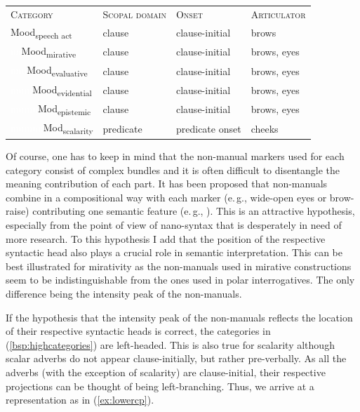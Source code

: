 \begin{exe}
\ex\label{bsp:highcategories} 
\begin{adjustbox}{max width=0.9\textwidth}
\begin{tabular}[t]{p{3.2cm}p{2.8cm}p{2.6cm}p{2.5cm}} %
\textsc{Category} & \textsc{Scopal domain} & \textsc{Onset} & \textsc{Articulator}  \\
Mood\textsubscript{speech act} & clause & clause-initial & brows \\
\textcolor{white}{nn}Mood\textsubscript{mirative} & clause & clause-initial & brows, eyes\\
\textcolor{white}{nnn}Mood\textsubscript{evaluative} & clause & clause-initial & brows, eyes \\
\textcolor{white}{nnnn}Mood\textsubscript{evidential} & clause & clause-initial & brows, eyes \\
\textcolor{white}{nnnnn}Mod\textsubscript{epistemic} & clause & clause-initial & brows, eyes \\
\textcolor{white}{nnnnnn}Mod\textsubscript{scalarity} & predicate & predicate onset & cheeks \\
\end{tabular}
\end{adjustbox}
\end{exe}

\noindent Of course, one has to keep in mind that the non-manual markers used for each category consist of complex bundles and it is often difficult to disentangle the meaning contribution of each part. It has been proposed that non-manuals combine in a compositional way with each marker (e.\,g., wide-open eyes or brow-raise) contributing one semantic feature (e.\,g., \citealt{herrmann2013modal}). This is an attractive hypothesis, especially from the point of view of nano-syntax that is desperately in need of more research. To this hypothesis I add that the position of the respective syntactic head also plays a crucial role in semantic interpretation. This can be best illustrated for mirativity as the non-manuals used in mirative constructions seem to be indistinguishable from the ones used in polar interrogatives. The only difference being the intensity peak of the non-manuals. 

If the hypothesis that the intensity peak of the non-manuals reflects the location of their respective syntactic heads is correct, the categories in (\ref{bsp:highcategories}) are left-headed. This is also true for scalarity although scalar adverbs do not appear clause-initially, but rather pre-verbally. As all the adverbs (with the exception of scalarity) are clause-initial, their respective projections can be thought of being left-branching. Thus, we arrive at a representation as in (\ref{ex:lowercp}). 

